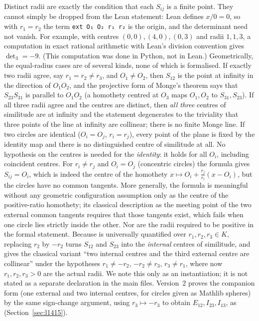 \documentclass[11pt]{article}
\theoremstyle{definition}
\theoremstyle{remark}
\newcommand{\lean}[1]{\texttt{#1}}
\begin{document}
Distinct radii are exactly the condition that each $S_{ij}$ is a finite
point. They cannot simply be dropped from the Lean statement: Lean defines $x/0=0$, so with
$r_1=r_2$ the term \lean{ext O₁ O₂ r₁ r₂} is the origin, and the determinant need not vanish. For
example, with centres $(0,0),(4,0),(0,3)$ and radii $1,1,3$, a computation in exact rational
arithmetic with Lean's division convention gives $\det_3=-9$. (This computation was done in Python,
not in Lean.) Geometrically, the equal-radius cases are of several kinds, none of which is
formalised. If exactly two radii agree, say $r_1=r_2\ne r_3$, and $O_1\ne O_2$, then $S_{12}$ is
the point at infinity in the direction of $O_1O_2$, and the projective form of Monge's theorem
says that $S_{23}S_{31}$ is parallel to $O_1O_2$ (a homothety centred at $O_3$ maps $O_1,O_2$ to
$S_{31},S_{23}$). If all three radii agree and the centres are distinct, then \emph{all three}
centres of similitude are at infinity and the statement degenerates to the triviality that three
points of the line at infinity are collinear; there is no finite Monge line. If two circles are
identical ($O_i=O_j$, $r_i=r_j$), every point of the plane is fixed by the identity map and there
is no distinguished centre of similitude at all. No hypothesis on the centres is needed for the
\emph{identity}: it holds for all $O_i$, including coincident centres. For $r_i\ne r_j$ and
$O_i=O_j$ (concentric circles) the formula gives $S_{ij}=O_i$, which is indeed the centre of the
homothety $x\mapsto O_i+\tfrac{r_j}{r_i}(x-O_i)$, but the circles have no common tangents.
More generally, the formula is meaningful without any geometric configuration assumption only as
the centre of the positive-ratio homothety; its classical description as the meeting point of the
two external common tangents requires that those tangents exist, which fails when one circle
lies strictly inside the other.
Nor are the radii required to be positive in the formal statement. Because  is universally quantified
over $r_1,r_2,r_3\in K$, replacing $r_2$ by $-r_2$ turns $S_{12}$ and $S_{23}$ into the
\emph{internal} centres of similitude, and gives the classical variant ``two internal centres and
the third external centre are collinear'' under the hypotheses $r_1\ne-r_2$, $-r_2\ne r_3$,
$r_3\ne r_1$, where now $r_1,r_2,r_3>0$ are the actual radii. We note this only as an instantiation; it is not stated as a separate declaration in the main files.
Version~2 proves the companion form (one external and two internal centres, for circles given as
Mathlib spheres) by the same sign-change argument, using $r_3\mapsto-r_3$ to obtain $E_{12},I_{23},I_{13}$, as 
(Section~\ref{sec:l1415}).
\end{document}
